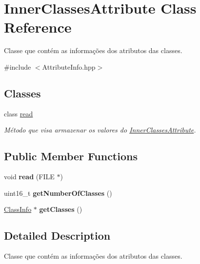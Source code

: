 \hypertarget{classInnerClassesAttribute}{}\section{Inner\+Classes\+Attribute Class Reference}
\label{classInnerClassesAttribute}


Classe que contém as informações dos atributos das classes.  




{\ttfamily \#include $<$Attribute\+Info.\+hpp$>$}

\subsection*{Classes}
\begin{DoxyCompactItemize}
\item 
class \hyperlink{classInnerClassesAttribute_1_1read}{read}
\begin{DoxyCompactList}\small\item\em Método que visa armazenar os valores do \hyperlink{classInnerClassesAttribute}{Inner\+Classes\+Attribute}. \end{DoxyCompactList}\end{DoxyCompactItemize}
\subsection*{Public Member Functions}
\begin{DoxyCompactItemize}
\item 
void {\bfseries read} (F\+I\+LE $\ast$)\hypertarget{classInnerClassesAttribute_ae43a7123a6838f72aebd1b0a829bfb3d}{}\label{classInnerClassesAttribute_ae43a7123a6838f72aebd1b0a829bfb3d}

\item 
uint16\+\_\+t {\bfseries get\+Number\+Of\+Classes} ()\hypertarget{classInnerClassesAttribute_ad22800b6d8b252ee045c438258549570}{}\label{classInnerClassesAttribute_ad22800b6d8b252ee045c438258549570}

\item 
\hyperlink{classClassInfo}{Class\+Info} $\ast$ {\bfseries get\+Classes} ()\hypertarget{classInnerClassesAttribute_a9e5d2a9b9304e72f532ef6033dac8eea}{}\label{classInnerClassesAttribute_a9e5d2a9b9304e72f532ef6033dac8eea}

\end{DoxyCompactItemize}


\subsection{Detailed Description}
Classe que contém as informações dos atributos das classes. 

